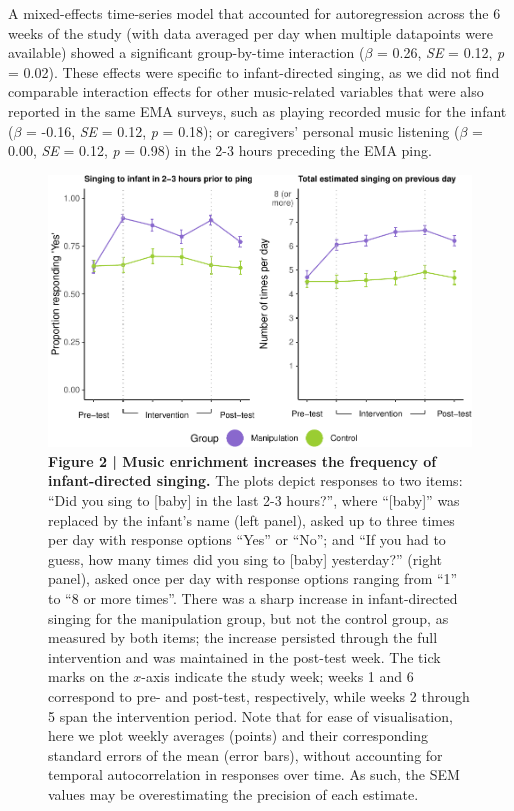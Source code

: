 \documentclass[
]{article}
\begin{document}
A mixed-effects time-series model that accounted for autoregression
across the 6 weeks of the study (with data averaged per day when
multiple datapoints were available) showed a significant group-by-time
interaction (\(\beta\) = 0.26, \emph{SE} = 0.12, \emph{p} = 0.02). These
effects were specific to infant-directed singing, as we did not find
comparable interaction effects for other music-related variables that
were also reported in the same EMA surveys, such as playing recorded
music for the infant (\(\beta\) = -0.16, \emph{SE} = 0.12, \emph{p} =
0.18); or caregivers' personal music listening (\(\beta\) = 0.00,
\emph{SE} = 0.12, \emph{p} = 0.98) in the 2-3 hours preceding the EMA
ping.

\begin{figure}[p]
\includegraphics{MIPH_childdev_files/figure-latex/fig2-1} \caption{\textbf{Figure 2 | Music enrichment increases the frequency of infant-directed singing.} The plots depict responses to two items: ``Did you sing to [baby] in the last 2-3 hours?'', where ``[baby]'' was replaced by the infant's name (left panel), asked up to three times per day with response options ``Yes'' or ``No''; and ``If you had to guess, how many times did you sing to [baby] yesterday?'' (right panel), asked once per day with response options ranging from ``1'' to ``8 or more times''. There was a sharp increase in infant-directed singing for the manipulation group, but not the control group, as measured by both items; the increase persisted through the full intervention and was maintained in the post-test week. The tick marks on the $x$-axis indicate the study week; weeks 1 and 6 correspond to pre- and post-test, respectively, while weeks 2 through 5 span the intervention period. Note that for ease of visualisation, here we plot weekly averages (points) and their corresponding standard errors of the mean (error bars), without accounting for temporal autocorrelation in responses over time. As such, the SEM values may be overestimating the precision of each estimate.}\label{fig:fig2}
\end{figure}
\end{document}
